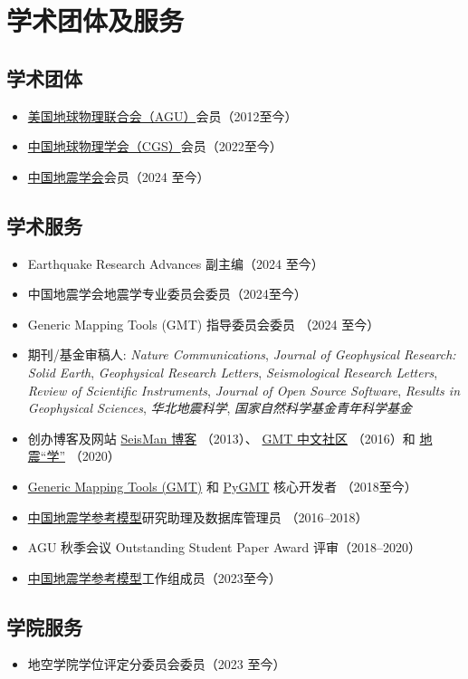 \section{学术团体及服务}

\subsection{学术团体}
\begin{itemize}
\item \href{https://sites.agu.org/}{美国地球物理联合会（AGU）}会员（2012至今）
\item \href{http://www.cgscgs.org.cn/}{中国地球物理学会（CGS）}会员（2022至今）
\item \href{https://www.ssoc.org.cn/}{中国地震学会}会员（2024 至今）
\end{itemize}

\subsection{学术服务}
\begin{itemize}
\item Earthquake Research Advances 副主编（2024 至今）
\item 中国地震学会地震学专业委员会委员（2024至今）
\item Generic Mapping Tools (GMT) 指导委员会委员 （2024 至今）
\item 期刊/基金审稿人:
      \emph{Nature Communications},
      \emph{Journal of Geophysical Research: Solid Earth},
      \emph{Geophysical Research Letters},
      \emph{Seismological Research Letters},
      \emph{Review of Scientific Instruments},
      \emph{Journal of Open Source Software},
      \emph{Results in Geophysical Sciences},
      \emph{华北地震科学},
      \emph{国家自然科学基金青年科学基金}
\item 创办博客及网站
      \href{https://blog.seisman.info}{SeisMan 博客} （2013）、
      \href{http://gmt-china.org/}{GMT 中文社区} （2016）和
      \href{https://seismo-learn.org/}{地震``学''} （2020）
\item \href{https://github.com/GenericMappingTools/gmt}{Generic Mapping Tools (GMT)} 和
      \href{https://github.com/GenericMappingTools/pygmt}{PyGMT} 核心开发者 （2018至今）
\item \href{http://chinageorefmodel.org/}{中国地震学参考模型}研究助理及数据库管理员 （2016--2018）
\item AGU 秋季会议 Outstanding Student Paper Award 评审（2018--2020）
\item \href{http://chinageorefmodel.org/}{中国地震学参考模型}工作组成员（2023至今）
\end{itemize}

\subsection{学院服务}
\begin{itemize}
\item 地空学院学位评定分委员会委员（2023 至今）
\end{itemize}
